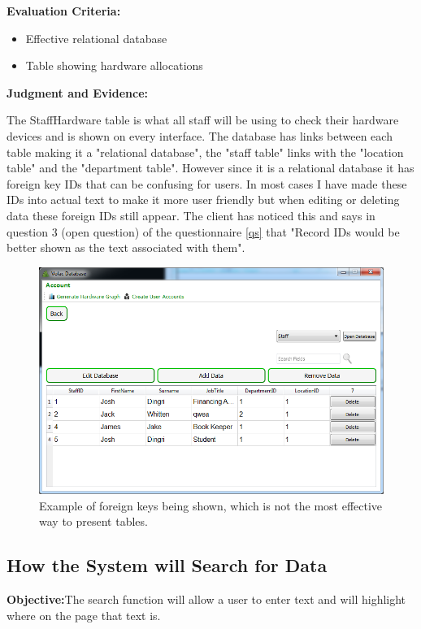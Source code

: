 \textbf{Evaluation Criteria:}
\begin{itemize}
\item{Effective relational database}
\item{Table showing hardware allocations}
\end{itemize}

\textbf{Judgment and Evidence:}

The StaffHardware table is what all staff will be using to check their hardware devices and is shown on every interface. The database has links between each table making it a "relational database", the "staff table" links with the "location table" and the "department table". However since it is a relational database it has foreign key IDs that can be confusing for users. In most cases I have made these IDs into actual text to make it more user friendly but when editing or deleting data these foreign IDs still appear. The client has noticed this and says in question 3  (open question) of the questionnaire \ref{qs} that "Record IDs would be better shown as the text associated with them".

\begin{figure}[H]
    \includegraphics[width=\textwidth]{./Testing/Images/RemoveDataButtons.png}
    \caption{Example of foreign keys being shown, which is not the most effective way to present tables.} 
\end{figure}

\subsection{How the System will Search for Data}

\textbf{Objective:}The search function will allow a user to enter text and will highlight where on the page that text is.

